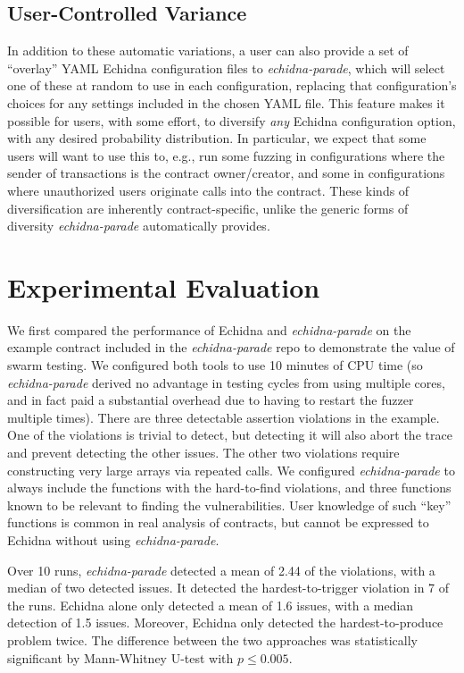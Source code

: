 \documentclass[sigconf,screen]{acmart}
\begin{document}
{\subsection{User-Controlled Variance}

In addition to these automatic variations, a user can also provide a
set of ``overlay'' YAML Echidna configuration files to
\emph{echidna-parade}, which will select one of these at random to use
in each configuration, replacing that configuration's choices for any
settings included in the chosen YAML file.  This feature makes it possible for users, with some effort, to diversify \emph{any} Echidna configuration option, with any desired probability distribution.  In particular, we expect that some users will want to use this to, e.g.,  run some fuzzing in configurations where the sender of transactions is the contract owner/creator, and some in configurations where unauthorized users originate calls into the contract.  These kinds of diversification are inherently contract-specific, unlike the generic forms of diversity \emph{echidna-parade} automatically provides.

\section{Experimental Evaluation}

We first compared the performance of Echidna and \emph{echidna-parade} on the example contract included in the \emph{echidna-parade} repo to demonstrate the value of swarm testing.  We configured both tools to use 10 minutes of CPU time (so \emph{echidna-parade} derived no advantage in testing cycles from using multiple cores, and in fact paid a substantial overhead due to having to restart the fuzzer multiple times).  There are three detectable assertion violations in the example.  One of the violations is trivial to detect, but detecting it will also abort the trace and prevent detecting the other issues.  The other two violations require constructing very large arrays via repeated calls.  We configured \emph{echidna-parade} to always include the functions with the hard-to-find violations, and three functions known to be relevant to finding the vulnerabilities.  User knowledge of such ``key'' functions is common in real analysis of contracts, but cannot be expressed to Echidna without using \emph{echidna-parade}.

Over 10 runs, \emph{echidna-parade} detected a mean of 2.44 of the violations, with a median of two detected issues.  It detected the hardest-to-trigger violation in 7 of the runs.  Echidna alone only detected a mean of 1.6 issues, with a median detection of 1.5 issues.  Moreover, Echidna only detected the hardest-to-produce problem twice.  The difference between the two approaches was statistically significant by Mann-Whitney U-test with $p \leq 0.005$.

}
\end{document}
